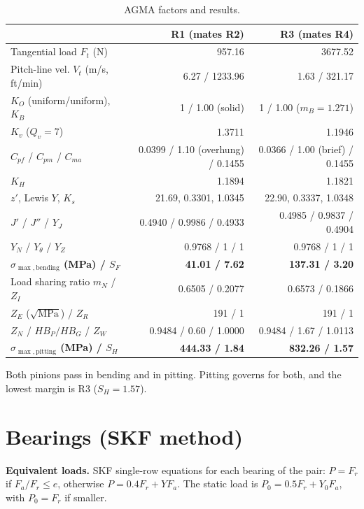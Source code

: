\documentclass[11pt,a4paper]{article}
\begin{document}
\begin{table}[H]\centering\small
\caption{AGMA factors and results.}
\setlength{\tabcolsep}{4pt}
\begin{tabular}{p{4.9cm}rr}\toprule
 & R1 (mates R2) & R3 (mates R4)\\\midrule
Tangential load $F_t$ (N) & 957.16 & 3677.52\\
Pitch-line vel. $V_t$ (m/s, ft/min) & 6.27 / 1233.96 & 1.63 / 321.17\\
$K_O$ (uniform/uniform), $K_B$ & 1 / 1.00 (solid) & 1 / 1.00 ($m_B=1.271$)\\
$K_v$ ($Q_v=7$) & 1.3711 & 1.1946\\
$C_{pf}$ / $C_{pm}$ / $C_{ma}$ & 0.0399 / 1.10 (overhung) / 0.1455 & 0.0366 / 1.00 (brief) / 0.1455\\
$K_H$ & 1.1894 & 1.1821\\
$z'$, Lewis $Y$, $K_s$ & 21.69, 0.3301, 1.0345 & 22.90, 0.3337, 1.0348\\
$J'$ / $J''$ / $Y_J$ & 0.4940 / 0.9986 / 0.4933 & 0.4985 / 0.9837 / 0.4904\\
$Y_N$ / $Y_\theta$ / $Y_Z$ & 0.9768 / 1 / 1 & 0.9768 / 1 / 1\\
\textbf{$\sigma_{\max,\mathrm{bending}}$ (MPa) / $S_F$} & \textbf{41.01 / 7.62} & \textbf{137.31 / 3.20}\\\midrule
Load sharing ratio $m_N$ / $Z_I$ & 0.6505 / 0.2077 & 0.6573 / 0.1866\\
$Z_E$ ($\sqrt{\mathrm{MPa}}$) / $Z_R$ & 191 / 1 & 191 / 1\\
$Z_N$ / $HB_P/HB_G$ / $Z_W$ & 0.9484 / 0.60 / 1.0000 & 0.9484 / 1.67 / 1.0113\\
\textbf{$\sigma_{\max,\mathrm{pitting}}$ (MPa) / $S_H$} & \textbf{444.33 / 1.84} & \textbf{832.26 / 1.57}\\\bottomrule
\end{tabular}\end{table}
Both pinions pass in bending and in pitting. Pitting governs for both, and the lowest margin is R3 ($S_H=1.57$).

\section{Bearings (SKF method)}
\textbf{Equivalent loads.} SKF single-row equations for each bearing of the pair: $P=F_r$ if $F_a/F_r\le e$, otherwise $P=0.4F_r+YF_a$. The static load is $P_0=0.5F_r+Y_0F_a$, with $P_0=F_r$ if smaller.
\end{document}
